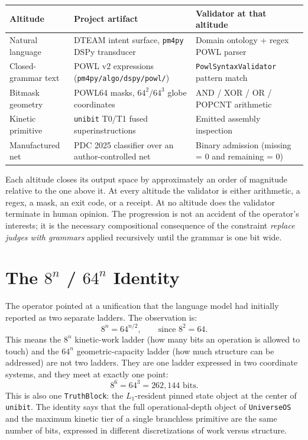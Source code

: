 \documentclass[11pt,letterpaper]{article}
\begin{document}
\begin{center}
\begin{tabular}{@{}p{3.5cm}p{5.5cm}p{4.5cm}@{}}
\toprule
\textbf{Altitude} & \textbf{Project artifact} & \textbf{Validator at that altitude} \\
\midrule
Natural language & DTEAM intent surface, \texttt{pm4py} DSPy transducer & Domain ontology + regex POWL parser \\
Closed-grammar text & POWL v2 expressions (\texttt{pm4py/algo/dspy/powl/}) & \texttt{PowlSyntaxValidator} pattern match \\
Bitmask geometry & POWL64 masks, \( 64^{2} / 64^{3} \) globe coordinates & AND / XOR / OR / POPCNT arithmetic \\
Kinetic primitive & \texttt{unibit} T0/T1 fused superinstructions & Emitted assembly inspection \\
Manufactured net & PDC 2025 classifier over an author-controlled net & Binary admission (missing = 0 and remaining = 0) \\
\bottomrule
\end{tabular}
\end{center}

Each altitude closes its output space by approximately an order of magnitude relative to the one above it. At every altitude the validator is either arithmetic, a regex, a mask, an exit code, or a receipt. At no altitude does the validator terminate in human opinion. The progression is not an accident of the operator's interests; it is the necessary compositional consequence of the constraint \emph{replace judges with grammars} applied recursively until the grammar is one bit wide.

\section{The \texorpdfstring{$8^{n}$ / $64^{n}$}{8\^n / 64\^n} Identity}

The operator pointed at a unification that the language model had initially reported as two separate ladders. The observation is:
\[
8^{n} = 64^{n/2}, \qquad \text{since } 8^{2} = 64.
\]
This means the \( 8^{n} \) kinetic-work ladder (how many bits an operation is allowed to touch) and the \( 64^{n} \) geometric-capacity ladder (how much structure can be addressed) are not two ladders. They are one ladder expressed in two coordinate systems, and they meet at exactly one point:
\[
8^{6} = 64^{3} = 262{,}144 \text{ bits}.
\]
This is also one \texttt{TruthBlock}: the \( L_{1} \)-resident pinned state object at the center of \texttt{unibit}. The identity says that the full operational-depth object of \texttt{UniverseOS} and the maximum kinetic tier of a single branchless primitive are the same number of bits, expressed in different discretizations of work versus structure.
\end{document}

